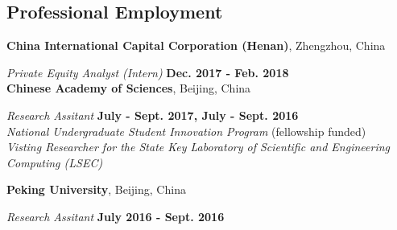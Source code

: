 \documentclass[margin,line]{res}
\newenvironment{list2}{
  \begin{list}{$\bullet$}{%
      \setlength{\itemsep}{0in}
      \setlength{\parsep}{0in} \setlength{\parskip}{0in}
      \setlength{\topsep}{0in} \setlength{\partopsep}{0in} 
      \setlength{\leftmargin}{0.2in}}}{\end{list}}
\begin{document}
\begin{resume}
\iffalse
\section{\sc Professional Employment}
{\bf China International Capital Corporation (Henan)}, Zhengzhou, China
\vspace{-.3cm}

{\em Private Equity Analyst (Intern)} \hfill {\bf Dec. 2017 - Feb. 2018}\\

{\bf Chinese Academy of Sciences}, Beijing, China
\vspace{-.3cm}

{\em Research Assitant} \hfill {\bf July - Sept. 2017, July - Sept. 2016}\\
{\em National Undergraduate Student Innovation Program} (fellowship funded) \\
{\em Visting Researcher for the State Key Laboratory of Scientific and Engineering Computing (LSEC)}
\smallskip

{\bf Peking University}, Beijing, China
\vspace{-.3cm}

{\em Research Assitant} \hfill {\bf July 2016 - Sept. 2016}\\



\end{resume}
\end{document}
